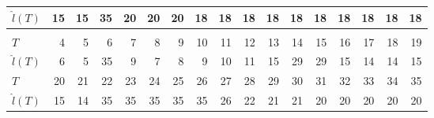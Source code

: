 \documentclass[12pt,a4paper]{article}
\begin{document}
\begin{table}
\begin{tabular*}{\textheight}{@{\extracolsep{\fill}}lrrrrrrrrrrrrrrrr}
		$\hat{l}(T)$ & 15 & 15 & 35 & 20 & 20 & 20 & 18 & 18 & 18 & 18 & 18 & 18 & 18 & 18 & 18 & 18 \\
		\midrule\addlinespace[2.5pt]
		\multicolumn{17}{c}{\textbf{$\tau=0.95,\ T_{\mathrm{entry}}(3)=28$}} \\
		\addlinespace[2.5pt]
		\midrule
		$T$ & 4 & 5 & 6 & 7 & 8 & 9 & 10 & 11 & 12 & 13 & 14 & 15 & 16 & 17 & 18 & 19 \\
		$\hat{l}(T)$ & 6 & 5 & 35 & 9 & 7 & 8 & 9 & 10 & 11 & 15 & 29 & 29 & 15 & 14 & 14 & 15 \\
		$T$ & 20 & 21 & 22 & 23 & 24 & 25 & 26 & 27 & 28 & 29 & 30 & 31 & 32 & 33 & 34 & 35 \\
		$\hat{l}(T)$ & 15 & 14 & 35 & 35 & 35 & 35 & 35 & 26 & 22 & 21 & 21 & 20 & 20 & 20 & 20 & 20 \\
		\bottomrule
	\end{tabular*}
\end{table}
\end{document}
